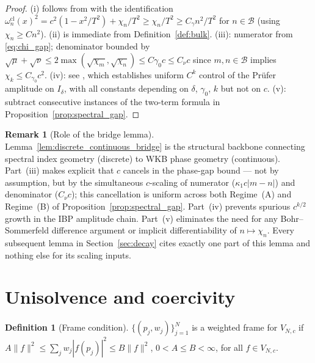 \documentclass[12pt,a4paper]{amsart}
\theoremstyle{definition}
\newtheorem{definition}[theorem]{Definition}
\newtheorem{remark}[theorem]{Remark}
\newcommand{\norm}[1]{\|#1\|}
\begin{document}
\begin{proof}
(i) follows from \cite[Lemma~2.3(i)]{PaperIV} with the identification
$\omega_n^{\mathrm{cl}}(x)^2=c^2(1-x^2/T^2)+\chi_n/T^2\ge\chi_n/T^2
\ge C_\gamma n^2/T^2$ for $n\in\mathcal{B}$ (using $\chi_n\ge Cn^2$).
(ii) is immediate from Definition~\ref{def:bulk}.
(iii): numerator from \eqref{eq:chi_gap}; denominator bounded by
$\sqrt\mu+\sqrt\nu\le 2\max(\sqrt{\chi_m},\sqrt{\chi_n})\le C\gamma_0 c
\le C_\nu c$ since $m,n\in\mathcal{B}$ implies $\chi_k\le C_{\gamma_0}c^2$.
(iv): see \cite[Lemma~2.4, Lemma~3.5]{PaperIV}, which establishes
uniform $C^k$ control of the Pr\"ufer amplitude on $I_\delta$, with all
constants depending on $\delta$, $\gamma_0$, $k$ but not on $c$.
(v): subtract consecutive instances of the two-term formula in
Proposition~\ref{prop:spectral_gap}.
\end{proof}

\begin{remark}[Role of the bridge lemma]
Lemma~\ref{lem:discrete_continuous_bridge} is the structural backbone
connecting spectral index geometry (discrete) to WKB phase geometry
(continuous). Part~(iii) makes explicit that $c$ cancels in the
phase-gap bound --- not by assumption, but by the simultaneous
$c$-scaling of numerator ($\kappa_1 c|m-n|$) and denominator
($C_\nu c$); this cancellation is uniform across both Regime~(A)
and Regime~(B) of Proposition~\ref{prop:spectral_gap}.
Part~(iv) prevents spurious $c^{k/2}$ growth in the IBP
amplitude chain. Part~(v) eliminates the need for any
Bohr--Sommerfeld difference argument or implicit differentiability
of $n\mapsto\chi_n$. Every subsequent lemma in Section~\ref{sec:decay}
cites exactly one part of this lemma and nothing else for its
scaling inputs.
\end{remark}

\section{Unisolvence and coercivity}\label{sec:coercivity}

\begin{definition}[Frame condition]\label{def:frame}
$\{(p_j,w_j)\}_{j=1}^N$ is a weighted frame for $V_{N,c}$ if
$A\norm{f}^2\le\sum_j w_j|f(p_j)|^2\le B\norm{f}^2$,
$0<A\le B<\infty$, for all $f\in V_{N,c}$.
\end{definition}
\end{document}
